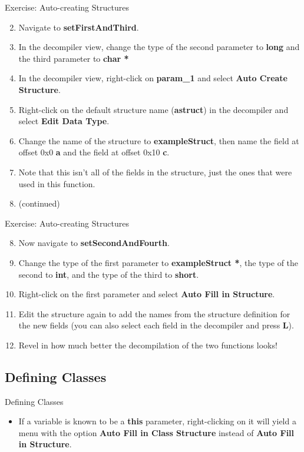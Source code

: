 \documentclass{beamer}
\begin{document}
\begin{frame}
\begin{block}{Exercise: Auto-creating Structures}
\begin{enumerate}
\setcounter{enumi}{1}
\item Navigate to \textbf{setFirstAndThird}. 
\item In the decompiler view, change the type of the second parameter to \textbf{long} and the third parameter to \textbf{char *}
\item In the decompiler view, right-click on \textbf{param\_1} and select \textbf{Auto Create Structure}.
\item Right-click on the default structure name (\textbf{astruct}) in the decompiler and select \textbf{Edit Data Type}.
\item Change the name of the structure to \textbf{exampleStruct}, then name the field at offset 0x0 \textbf{a} and the field at offset 0x10 \textbf{c}.
\item Note that this isn't all of the fields in the structure, just the ones that were used in this function.
\item[] (continued)
\end{enumerate}
\end{block}
\end{frame}

\begin{frame}
\begin{block}{Exercise: Auto-creating Structures}
\begin{enumerate}
\setcounter{enumi}{7}
\item Now navigate to \textbf{setSecondAndFourth}.
\item Change the type of the first parameter to \textbf{exampleStruct *}, the type of the second to \textbf{int}, and the type of the third to \textbf{short}.
\item Right-click on the first parameter and select \textbf{Auto Fill in Structure}.
\item Edit the structure again to add the names from the structure definition for the new fields (you can also select each field in the decompiler and press \textbf{L}).
\item Revel in how much better the decompilation of the two functions looks!
\end{enumerate}
\end{block}
\end{frame}

\subsection{Defining Classes}
\begin{frame}
\begin{block}{Defining Classes}
\begin{itemize}
\item If a variable is known to be a \textbf{this} parameter, right-clicking on it will yield a menu with the option \textbf{Auto Fill in Class Structure} instead 
of \textbf{Auto Fill in Structure}.
\end{itemize}
\end{block}
\end{frame}
\end{document}
